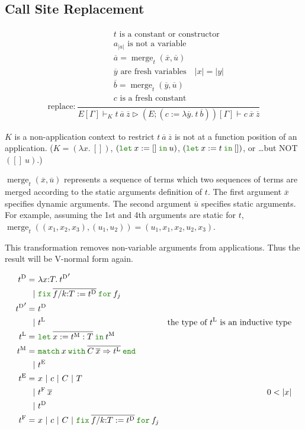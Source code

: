 \documentclass[a4paper,fleqn]{article}
\newcommand{\kwlet}{\mbox{\color{mygreen}\ttfamily let}}
\newcommand{\kwin}{\mbox{\color{mygreen}\ttfamily in}}
\newcommand{\kwmatch}{\mbox{\color{mygreen}\ttfamily match}}
\newcommand{\kwwith}{\mbox{\color{mygreen}\ttfamily with}}
\newcommand{\kwend}{\mbox{\color{mygreen}\ttfamily end}}
\newcommand{\kwfix}{\mbox{\color{mygreen}\ttfamily fix}}
\newcommand{\kwfor}{\mbox{\color{mygreen}\ttfamily for}}
\newcommand{\lam}[2]{\lambda #1.\:#2}
\newcommand{\lamT}[3]{\lambda #1\mathord{:}#2.\:#3}
\newcommand{\glodefB}[2]{(#1:=#2)}
\newcommand{\letin}[3]{\kwlet\:#1:=#2\:\kwin\:#3}
\newcommand{\letinM}[3]{\kwlet\:\rep{#1:=#2}\:\kwin\:#3}
\newcommand{\omatch}[2]{\kwmatch\:#1\:\kwwith\:{#2}\:\kwend}
\newcommand{\ofix}[2]{\kwfix\:{#1}\:\kwfor\:{#2}}
\newcommand{\tD}{{t^\mathrm{D}}}
\newcommand{\tE}{{t^\mathrm{E}}}
\newcommand{\tL}{{t^\mathrm{L}}}
\newcommand{\tM}{{t^\mathrm{M}}}
\newcommand{\tF}{{t^\mathrm{F}}}
\DeclareMathOperator{\merg}{merge}
\newcommand{\reltri}{\mathrel{\triangleright}}
\newcommand{\rep}[1]{\overline{#1}}
\begin{document}
\subsection{Call Site Replacement}\label{sec:call-site-replacement}

\begin{gather*}
  \text{replace:}~
    \dfrac{
      \begin{gathered}
        \text{$t$ is a constant or constructor} \\
        \text{$a_{|a|}$ is not a variable} \\
        \rep{a} = \merg_t(\rep{x}, \rep{u}) \\
        \text{$\rep{y}$ are fresh variables} \quad
        |x| = |y| \\
        \rep{b} = \merg_t(\rep{y}, \rep{u}) \\
        \text{$c$ is a fresh constant} \\
      \end{gathered}
    }{E[\Gamma] \vdash_K t\:\rep{a}\:\rep{z}
      \reltri
      (E;\glodefB{c}{\lam{\rep{y}}{t\:\rep{b}}})[\Gamma] \vdash c\:\rep{x}\:\rep{z}
    }
\end{gather*}

$K$ is a non-application context to restrict $t\:\rep{a}\:\rep{z}$ is not at a function position of an application.
($K = (\lam{x}{[]})$, $(\letin{x}{[]}{u})$, $(\letin{x}{t}{[]})$, or \ldots but NOT $([]\:u)$.)

$\merg_t(\rep{x}, \rep{u})$ represents a sequence of terms which two sequences of terms are merged according to the static arguments definition of $t$.
The first argument $\rep{x}$ specifies dynamic arguments.
The second argument $\rep{u}$ specifies static arguments.
For example, assuming the 1st and 4th arguments are static for $t$, $\merg_t((x_1, x_2, x_3), (u_1, u_2)) = (u_1, x_1, x_2, u_2, x_3)$.

This transformation removes non-variable arguments from applications.
Thus the result will be V-normal form again.

\begin{align*}
  \tD =&\ \lamT{x}{T}{\tD'} \\
      |&\ \ofix{\overline{f/k{:}T:=\tD}}{f_j} \\
  \tD' =&\ \tD \\
       |&\ \tL & \text{the type of $\tL$ is an inductive type} \\
  \tL =&\ \letinM{x}{\tM:T}{\tM} \\
  \tM =&\ \omatch{x}{\overline{C\:\overline{x}\Rightarrow \tL}} \\
      |&\ \tE \\
  \tE =&\ x ~|~ c ~|~ C ~|~ T \\
    |&\ \tF\:\rep{x} & \text{$0 < |x|$} \\
    |&\ \tD \\
  \tF =&\ x ~|~ c ~|~ C ~|~ \ofix{\overline{f/k{:}T:=\tD}}{f_j}
\end{align*}
\end{document}
